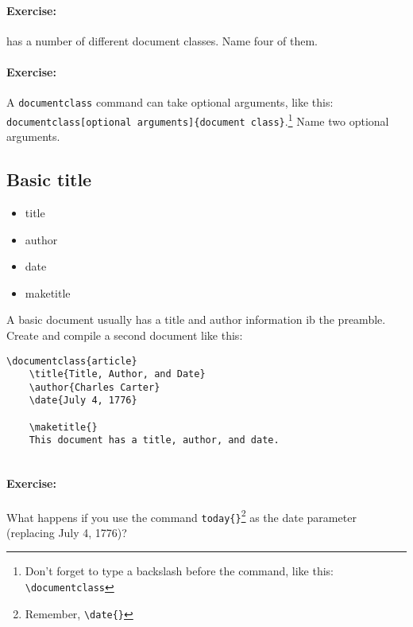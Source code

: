         \paragraph{Exercise:}\LaTeXe{} has a number of different document classes. Name four of them.

        \paragraph{Exercise:}A \texttt{documentclass} command can take optional arguments, like this: \texttt{documentclass[optional arguments]\{document class\}}.\footnote{Don't forget to type a backslash before the command, like this: \texttt{\textbackslash{}documentclass}} Name two optional arguments.

        \subsection{Basic title}
        \label{Basic-title}
        
        \begin{framed}
            \begin{itemize}
                \item{title}
                \item{author}
                \item{date}
                \item{maketitle}
            \end{itemize}
        \end{framed}

        A basic document usually has a title and author information ib the preamble. Create and compile a second document like this:        

        \begin{verbatim}
\documentclass{article}
    \title{Title, Author, and Date}
    \author{Charles Carter}
    \date{July 4, 1776}
 
    \maketitle{}
    This document has a title, author, and date.
    
        \end{verbatim}

        \paragraph{Exercise:}What happens if you use the command \texttt{today\{\}}\footnote{Remember, \texttt{\textbackslash{}date\{\}}} as the date parameter (replacing July 4, 1776)?

